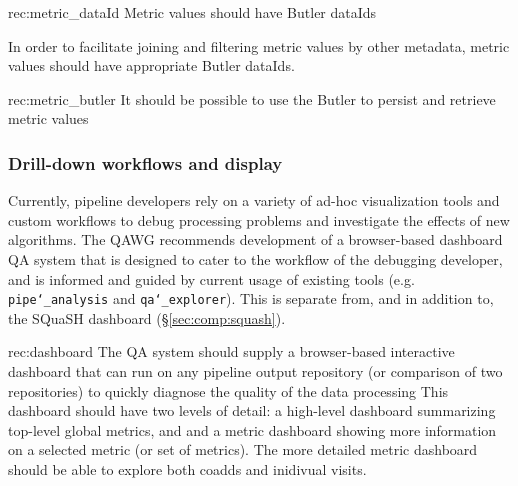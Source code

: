 \begin{recommendation}
    {rec:metric_dataId}
    {Metric values should have Butler dataIds}
\end{recommendation}

In order to facilitate joining and filtering metric values by other metadata, metric values should have appropriate Butler dataIds.

\begin{recommendation}
    {rec:metric_butler}
    {It should be possible to use the Butler to persist and retrieve metric values}
\end{recommendation}

\subsubsection{Drill-down workflows and display} \label{sec:metric_displays}

Currently, pipeline developers rely on a variety of ad-hoc visualization tools and custom workflows to debug processing problems and investigate the effects of new algorithms.
The QAWG recommends development of a browser-based dashboard QA system that is designed to cater to the workflow of the debugging developer, and is informed and guided by current usage of existing tools (e.g. \texttt{pipe\char`_analysis} and \texttt{qa\char`_explorer}).
This is separate from, and in addition to, the SQuaSH dashboard (\S \ref{sec:comp:squash}).

\begin{recommendation}
    {rec:dashboard}
    {The QA system should supply a browser-based interactive dashboard that can run on any pipeline output repository (or comparison of two repositories) to quickly diagnose the quality of the data processing}
This dashboard should have two levels of detail: a high-level dashboard summarizing top-level global metrics, and and a metric dashboard showing more information on a selected metric (or set of metrics).  The more detailed metric dashboard should be able to explore both coadds and inidivual visits.
\end{recommendation}


